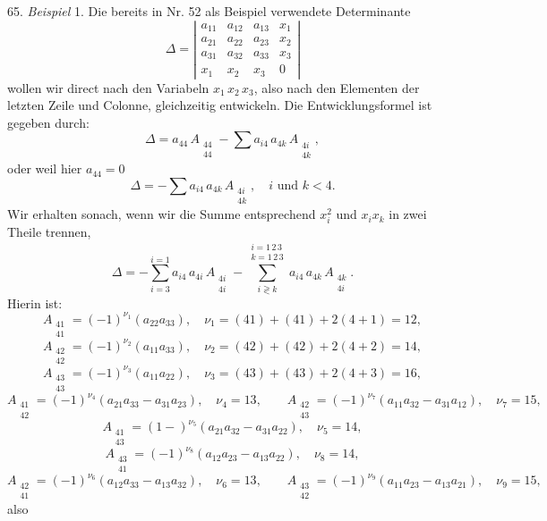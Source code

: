 \documentclass[11pt]{article}
\let\Delta\varDelta
\begin{document}
65. \textit{Beispiel} 1. Die bereits in Nr. 52 als Beispiel verwendete Determinante
\[
\Delta = \left|\begin{array}{cccc}
a_{11} & a_{12} & a_{13} & x_1\\
a_{21} & a_{22} & a_{23} & x_2\\
a_{31} & a_{32} & a_{33} & x_3\\
x_1 & x_2 & x_3 & 0
\end{array}\right|
\]
wollen wir direct nach den Variabeln $x_1\,x_2\,x_3$, also nach den Elementen der letzten Zeile und Colonne, gleichzeitig entwickeln. Die Entwicklungsformel ist gegeben durch:
\[
\Delta = a_{44}\,A_{\substack{44\\44}} - \sum a_{i4}\,a_{4k}\,A_{\substack{4i\\4k}},
\]
oder weil hier $a_{44}=0$
\[
\Delta = -\sum a_{i4}\,a_{4k}\,A_{\substack{4i\\4k}},\quad i \text{ und } k<4.
\]
Wir erhalten sonach, wenn wir die Summe entsprechend $x_i^2$ und $x_i x_k$ in zwei Theile trennen,
\[
\Delta = -\sum_{i=3}^{i=1} a_{i4}\,a_{4i}\,A_{\substack{4i\\4i}} - \sum_{i\gtrless k}^{\substack{i=1\,2\,3\\k=1\,2\,3}} a_{i4}\,a_{4k}\,A_{\substack{4k\\4i}}.
\]
Hierin ist:
\[
A_{\substack{41\\41}} = (-1)^{\nu_1}(a_{22}a_{33}),\quad \nu_1=(41)+(41)+2(4+1)=12,
\]
\[
A_{\substack{42\\42}} = (-1)^{\nu_2}(a_{11}a_{33}),\quad \nu_2=(42)+(42)+2(4+2)=14,
\]
\[
A_{\substack{43\\43}} = (-1)^{\nu_3}(a_{11}a_{22}),\quad \nu_3=(43)+(43)+2(4+3)=16,
\]
\[
A_{\substack{41\\42}} = (-1)^{\nu_4}(a_{21}a_{33}-a_{31}a_{23}),\quad \nu_4=13,\qquad
A_{\substack{42\\43}} = (-1)^{\nu_7}(a_{11}a_{32}-a_{31}a_{12}),\quad \nu_7=15,
\]
\[
A_{\substack{41\\43}} = (1-)^{\nu_5}(a_{21}a_{32}-a_{31}a_{22}),\quad \nu_5=14,
\] %
\[
A_{\substack{43\\41}} = (-1)^{\nu_8}(a_{12}a_{23}-a_{13}a_{22}),\quad \nu_8=14,
\]
\[
A_{\substack{42\\41}} = (-1)^{\nu_6}(a_{12}a_{33}-a_{13}a_{32}),\quad \nu_6=13,\qquad
A_{\substack{43\\42}} = (-1)^{\nu_9}(a_{11}a_{23}-a_{13}a_{21}),\quad \nu_9=15,
\]
also
\end{document}
